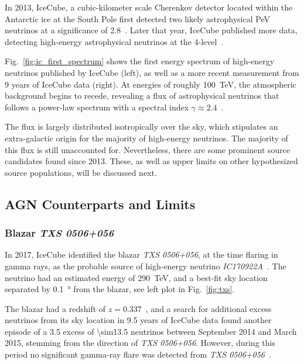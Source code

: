 In 2013, IceCube, a cubic-kilometer scale Cherenkov detector located within the Antarctic ice at the South Pole first detected two likely astrophysical \unit{\peta\eV} neutrinos at a significance of \SI{2.8}{\sigma}~. Later that year, IceCube published more data, detecting high-energy astrophysical neutrinos at the \SI{4}{\sigma}-level~.

Fig.~\ref{fig:ic_first_spectrum} shows the first energy spectrum of high-energy neutrinos published by IceCube (left), as well as a more recent measurement from 9 years of IceCube data (right). At energies of roughly \SI{100}{\tera\eV}, the atmospheric background begins to recede, revealing a flux of astrophysical neutrinos that follows a power-law spectrum with a spectral index $\gamma\approx2.4$~.

The flux is largely distributed isotropically over the sky, which stipulates an extra-galactic origin for the majority of high-energy neutrinos. The majority of this flux is still unaccounted for. Nevertheless, there are some prominent source candidates found since 2013. These, as well as upper limits on other hypothesized source populations, will be discussed next.

\subsection{AGN Counterparts and Limits}

\subsubsection{Blazar \emph{TXS 0506+056}}
In 2017, IceCube identified the blazar \emph{TXS 0506+056}, at the time flaring in gamma rays, as the probable source of high-energy neutrino \emph{IC170922A}~. The neutrino had an estimated energy of \SI{290}{\tera\eV}, and a best-fit sky location separated by \SI{0.1}{\degree} from the blazar, see left plot in Fig.~\ref{fig:txs}.

The blazar had a redshift of $z=0.337$~, and a search for additional excess neutrinos from its sky location in 9.5 years of IceCube data found another episode of a \SI{3.5}{\sigma} excess of \num{\sim13.5} neutrinos between September 2014 and March 2015, stemming from the direction of \emph{TXS 0506+056}. However, during this period no significant gamma-ray flare was detected from \emph{TXS 0506+056}~.

